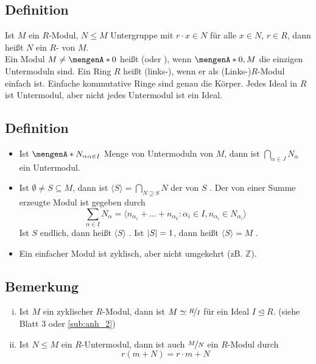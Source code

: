\subsection[Definition: Untermodul, einfache Moduln und Ringe]{Definition} %
\label{sub:24}
Ist $M$ ein $R$-Modul, $N \le M$ Untergruppe mit $r \cdot x \in N$ für alle $x \in N$, $r \in R$, dann heißt $N$ ein $R$- von $M$.
 \smallskip \\
Ein Modul $M \not= \set{0}$ heißt  (oder ), wenn $\set{0},M$ die einzigen Untermoduln sind. 
Ein Ring $R$ heißt (links-), wenn er als (Links-)$R$-Modul einfach ist.  
Einfache kommutative Ringe sind genau die Körper. Jedes Ideal in $R$ ist Untermodul, aber nicht jedes Untermodul ist ein Ideal.

\subsection[Definition: erzeugte Untermoduln]{Definition} %
\label{sub:25}
\begin{itemize}
	\item Ist $\set{N_\alpha}_{\alpha \in I} $ Menge von Untermoduln von $M$, dann ist $\bigcap_{\alpha \in J} N_\alpha$ ein Untermodul.
	\item Ist $\emptyset \not= S \subseteq M$, dann ist $\langle S \rangle = \bigcap_{N \supseteq S} N$ der von $S$ . Der von einer Summe 
	erzeugte Modul ist gegeben durch
	\[
		\sum_{\alpha \in I} N_\alpha = \langle n_{\alpha_1} + \ldots + n_{\alpha_k} : \alpha_i \in I, n_{\alpha_i} \in N_{\alpha_i}\rangle
	\] 
	Ist $S$ endlich, dann heißt $\langle S \rangle$ . Ist $\abs*{S}=1 $, dann heißt $\langle S \rangle = M$ .
	\item Ein einfacher Modul ist zyklisch, aber nicht umgekehrt (zB. $\mathds{Z}$).   
\end{itemize}

\subsection[Bemerkung zu Modulstrukturen auf Quotienten]{Bemerkung} %
\label{sub:26}
\begin{enumerate}[(i)]
	\item Ist $M$ ein zyklischer $R$-Modul, dann ist $M \simeq \nicefrac{R}{I}$ für ein Ideal $I \unlhd R$. \hfill(siehe Blatt 3 oder \ref{sub:anh_2})
	\item Ist $N \le M$ ein $R$-Untermodul, dann ist auch $\nicefrac{M}{N}$ ein $R$-Modul durch 
	\[
		r(m + N) = r \cdot m + N
	\]
\end{enumerate}

